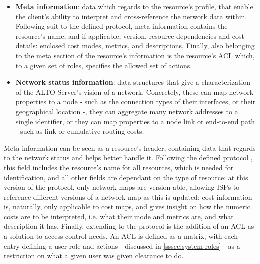 \begin{itemize}
        \item \textbf{Meta information}: data which regards to the resource's profile, that enable the client's ability to interpret and cross-reference the network data within.
            Following suit to the defined protocol, meta information contains the resource's name, and if applicable, version, resource dependencies and cost details: enclosed cost modes, metrics, and descriptions.
            Finally, also belonging to the meta section of the resource's information is the resource's ACL which, to a given set of roles, specifies the allowed set of actions.

        \item \textbf{Network status information}: data structures that give a characterization of the ALTO Server's vision of a network.
            Concretely, these can map network properties to a node - such as the connection types of their interfaces, or their geographical location -, they can aggregate many network addresses to a single identifier, or they can map properties to a node link or end-to-end path - such as link or cumulative routing costs.
\end{itemize}

    Meta information can be seen as a resource's header, containing data that regards to the network status and helps better handle it.
    Following the defined protocol \cite{alto-protocol}, this field includes the resource's name for all resources, which is needed for identification, and all other fields are dependant on the type of resource: at this version of the protocol, only network maps are version-able, allowing ISPs to reference different versions of a network map as this is updated; cost information is, naturally, only applicable to cost maps, and gives insight on how the numeric costs are to be interpreted, i.e. what their mode and metrics are, and what description it has.
    Finally, extending to the protocol is the addition of an ACL as a solution to access control needs.
    An ACL is defined as a matrix, with each entry defining a user role and actions - discussed in \ref{sssec:system-roles} - as a restriction on what a given user was given clearance to do.

